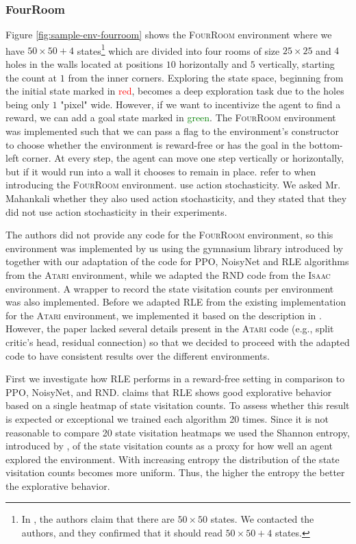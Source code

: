\documentclass[10pt]{article} %
\begin{document}
\subsubsection{FourRoom}
Figure \ref{fig:sample-env-fourroom} shows the \textsc{FourRoom} environment where we have $50\times50 + 4$ states\footnote{In \cite{rle-paper}, the authors claim that there are $50\times 50$ states. We contacted the authors, and they confirmed that it should read $50\times 50 + 4$ states.} which are divided into four rooms of size $25\times25$ and $4$ holes in the walls located at positions $10$ horizontally and $5$ vertically, starting the count at $1$ from the inner corners. Exploring the state space, beginning from the initial state marked in \textcolor{red}{red}, becomes a deep exploration task due to the holes being only $1$ "pixel" wide. However, if we want to incentivize the agent to find a reward, we can add a goal state marked in \textcolor{green}{green}. The \textsc{FourRoom} environment was implemented such that we can pass a flag to the environment's constructor to choose whether the environment is reward-free or has the goal in the bottom-left corner. At every step, the agent can move one step vertically or horizontally, but if it would run into a wall it chooses to remain in place. \cite{rle-paper} refer to \cite{grid-world-paper} when introducing the \textsc{FourRoom} environment. \cite{grid-world-paper} use action stochasticity. We asked Mr. Mahankali whether they also used action stochasticity, and they stated that they did not use action stochasticity in their experiments. 

The authors did not provide any code for the \textsc{FourRoom} environment, so this environment was implemented by us using the gymnasium library introduced by \cite{gymnasium-paper} together with our adaptation of the code for PPO, NoisyNet and RLE algorithms from the \textsc{Atari} environment, while we adapted the RND code from the \textsc{Isaac} environment. A wrapper to record the state visitation counts per environment was also implemented. Before we adapted RLE from the existing implementation for the \textsc{Atari} environment, we implemented it based on the description in \cite{rle-paper}. However, the paper lacked several details present in the \textsc{Atari} code (e.g., split critic's head, residual connection) so that we decided to proceed with the adapted code to have consistent results over the different environments. 

First we investigate how RLE performs in a reward-free setting in comparison to PPO, NoisyNet, and RND. \cite{rle-paper} claims that RLE shows good explorative behavior based on a single heatmap of state visitation counts. To assess whether this result is expected or exceptional we trained each algorithm 20 times. Since it is not reasonable to compare 20 state visitation heatmaps we used the Shannon entropy, introduced by \cite{shannon-entropy-paper}, of the state visitation counts as a proxy for how well an agent explored the environment. With increasing entropy the distribution of the state visitation counts becomes more uniform. Thus, the higher the entropy the better the explorative behavior. 
\end{document}

